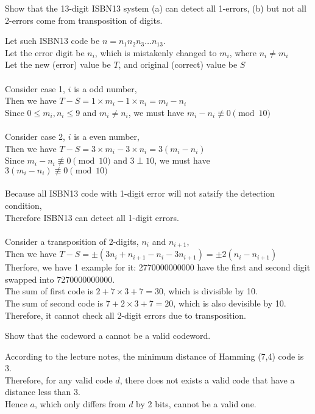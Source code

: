 \documentclass[12pt]{article}
\newenvironment{question}[2][Question]{\begin{trivlist}
    \item[\hskip \labelsep {\bfseries #1}\hskip \labelsep {\bfseries #2.}]}{\end{trivlist}}
\newenvironment{answer}[2][Answer]{\begin{trivlist}
    \item[\hskip \labelsep {\bfseries #1}\hskip \labelsep {\bfseries #2.}]}{\end{trivlist}}
\begin{document}
\begin{question}{Q. 1}
	Show that the 13-digit ISBN13 system (a) can detect all 1-errors, (b)
	but not all 2-errors come from transposition of digits.
\end{question}
\begin{answer}{Q. 1}
	\hfill \break
	Let such ISBN13 code be $n=n_1 n_2 n_3 \hdots n_{13}$. \\
	Let the error digit be $n_i$, which is mistakenly changed to $m_i$, where $n_i\neq m_i$\\
	Let the new (error) value be $T$, and original (correct) value be $S$\\ \\
	Consider case 1, $i$ is a odd number, \\
	Then we have $T-S=1\times m_i -1 \times n_i = m_i-n_i$ \\
	Since $0\leq m_i,n_i\leq 9$ and $m_i\neq n_i$, we must have $m_i-n_i \not\equiv 0 \pmod {10}$ \\ \\
	Consider case 2, $i$ is a even number, \\
	Then we have $T-S=3\times m_i - 3 \times n_i = 3\left(m_i-n_i\right)$ \\
	Since $m_i-n_i \not\equiv 0 \pmod {10}$ and $3 \perp 10$, we must have $3\left(m_i-n_i\right) \not\equiv 0 \pmod {10}$ \\ \\
	Because all ISBN13 code with 1-digit error will not satsify the detection condition,\\
	Therefore ISBN13 can detect all 1-digit errors. \\ \\
	Consider a transposition of 2-digits, $n_i$ and $n_{i+1}$, \\
	Then we have $T-S=\pm \left( 3 n_i+n_{i+1}-n_i-3n_{i+1}\right)= \pm 2 \left( n_i-n_{i+1} \right)$ \\
	Therfore, we have 1 example for it: 2770000000000 have the first and second digit swapped into 7270000000000. \\
	The sum of first code is $2+7\times 3 + 7=30$, which is divisible by 10. \\
	The sum of second code is $7+2\times 3+7=20$, which is also devisible by 10. \\
	Therefore, it cannot check all 2-digit errors due to transposition.
\end{answer}

\begin{question}{Q. 2}
	Show that the codeword a cannot be a valid codeword.
\end{question}
\begin{answer}{Q. 2}
	\hfill \break
	According to the lecture notes, the minimum	distance of Hamming (7,4) code is 3. \\
	Therefore, for any valid code $d$, there does not exists a valid code that have a distance less than 3. \\
	Hence $a$, which only differs from $d$ by 2 bits, cannot be a valid one.
\end{answer}
\end{document}
